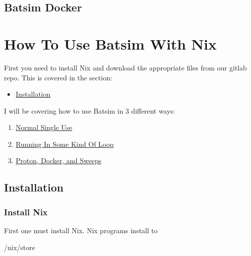 \documentclass[titlepage]{article}
\let\oldsection\section
\renewcommand\section{\clearpage\oldsection}
\newenvironment{regular}{\color{black}}{}
\begin{document}

\subsection{Batsim Docker}


\section{How To Use Batsim With Nix}
\hypertarget{how_to_use_batsim_nix}{}
\begin{regular}
First you need to install Nix and download the appropriate files from our gitlab repo.  This is covered in the section:
\begin{itemize}
  \item \hyperlink{howto_installation}{Installation}
\end{itemize}
I will be covering how to use Batsim in 3 different ways:

\begin{enumerate}
\item \hyperlink{howto_normal_single_use}{Normal Single Use}
\item \hyperlink{howto_running_in_loop}{Running In Some Kind Of Loop}
\item \hyperlink{howto_proton_docker_sweeps}{Proton, Docker, and Sweeps}
\end{enumerate}
\end{regular}

\hypertarget{howto_installation}{}
\subsection{Installation}


\subsubsection{Install Nix}
\begin{regular}
First one must install Nix.  Nix programs install to 
\end{regular}
\begin{terminal}
/nix/store
\end{terminal}
\end{document}
